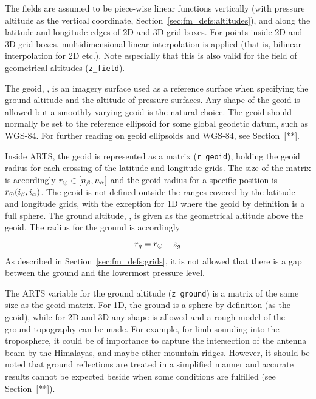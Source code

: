 The fields are assumed to be piece-wise linear functions vertically
(with pressure altitude as the vertical coordinate,
Section~\ref{sec:fm_defs:altitudes}), and along the latitude and
longitude edges of 2D and 3D grid boxes. For points inside 2D and 3D
grid boxes, multidimensional linear interpolation is applied (that is,
bilinear interpolation for 2D etc.). Note especially that this is also
valid for the field of geometrical altitudes (\verb|z_field|).



\label{sec:fm_defs:geoid}

The geoid, \aRds{\odot}, is an imagery surface used as a reference
surface when specifying the ground altitude and the altitude of
pressure surfaces. Any shape of the geoid is allowed but a smoothly
varying geoid is the natural choice. The geoid should normally be set
to the reference ellipsoid for some global geodetic datum, such as
WGS-84. For further reading on geoid ellipsoids and WGS-84, see
Section~[**].

Inside ARTS, the geoid is represented as a matrix (\verb|r_geoid|),
holding the geoid radius for each crossing of the latitude and
longitude grids. The size of the matrix is accordingly $r_{\odot}
\in [n_{\beta},n_{\alpha}]$ and the geoid radius for a
specific position is $r_{\odot}(i_{\beta},i_{\alpha})$. The
geoid is not defined outside the ranges covered by the latitude and
longitude grids, with the exception for 1D where the geoid by
definition is a full sphere. 
The ground altitude, , is given as the geometrical altitude
above the geoid. The radius for the ground is accordingly
\begin{equation}
  r_{g} = r_{\odot} + z_{g}
 \label{eq:fm_defs:zground}
\end{equation}
As described in
Section~\ref{sec:fm_defs:grids}, it is not allowed that there is a gap
between the ground and the lowermost pressure level.

The ARTS variable for the ground altitude (\verb|z_ground|) is a
matrix of the same size as the geoid matrix.  For 1D, the ground is a
sphere by definition (as the geoid), while for 2D and 3D any shape is
allowed and a rough model of the ground topography can be made. For
example, for limb sounding into the troposphere, it could be of
importance to capture the intersection of the antenna beam by the
Himalayas, and maybe other mountain ridges.  However, it should be
noted that ground reflections are treated in a simplified manner and
accurate results cannot be expected beside when some conditions are
fulfilled (see Section~[**]).



